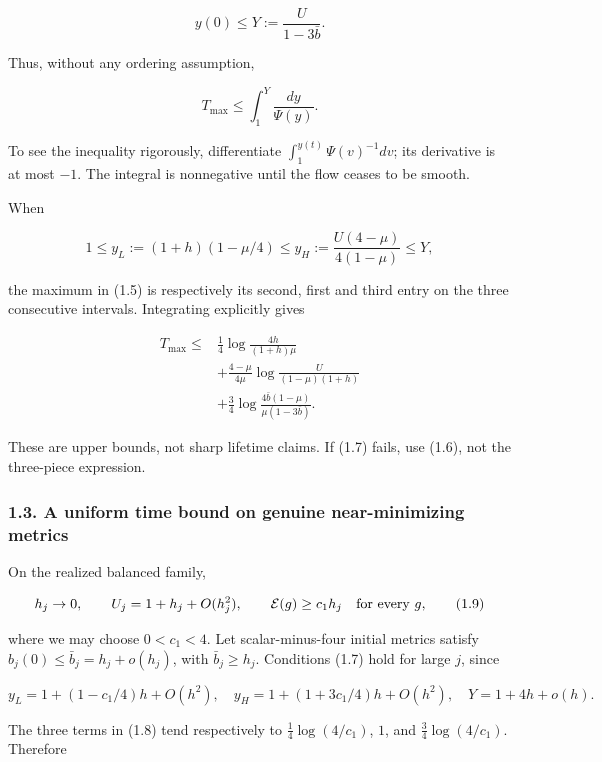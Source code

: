 \documentclass[
  10pt,
]{article}
\begin{document}
\[
 y(0)\le Y:=\frac U{1-3\bar b}.
\]

Thus, without any ordering assumption,

\[
                 T_{\max}\le\int_1^Y\frac{dy}{\Psi(y)}.       \tag{1.6}
\]

To see the inequality rigorously, differentiate
\(\int_1^{y(t)}\Psi(v)^{-1}dv\); its derivative is at most \(-1\). The
integral is nonnegative until the flow ceases to be smooth.

When

\[
 1\le y_L:=(1+h)(1-\mu/4)
 \le y_H:=\frac{U(4-\mu)}{4(1-\mu)}\le Y,            \tag{1.7}
\]

the maximum in (1.5) is respectively its second, first and third entry
on the three consecutive intervals. Integrating explicitly gives

\[
\boxed{\begin{aligned}
 T_{\max}\le{}&\frac14\log\frac{4h}{(1+h)\mu}\\
 &+\frac{4-\mu}{4\mu}
             \log\frac U{(1-\mu)(1+h)}\\
 &+\frac34\log\frac{4\bar b(1-\mu)}
                              {\mu(1-3\bar b)}.
\end{aligned}}                                                   \tag{1.8}
\]

These are upper bounds, not sharp lifetime claims. If (1.7) fails, use
(1.6), not the three-piece expression.

\hypertarget{a-uniform-time-bound-on-genuine-near-minimizing-metrics}{%
\subsubsection{1.3. A uniform time bound on genuine near-minimizing
metrics}\label{a-uniform-time-bound-on-genuine-near-minimizing-metrics}}

On the realized balanced family,

\[
 h_j\to0,\qquad U_j=1+h_j+O(h_j^2),\qquad
 \mathcal E(g)\ge c_1h_j\quad\hbox{for every }g,       \tag{1.9}
\]

where we may choose \(0<c_1<4\). Let scalar-minus-four initial metrics
satisfy \(b_j(0)\le\bar b_j=h_j+o(h_j)\), with \(\bar b_j\ge h_j\).
Conditions (1.7) hold for large \(j\), since

\[
 y_L=1+(1-c_1/4)h+O(h^2),\quad
 y_H=1+(1+3c_1/4)h+O(h^2),\quad
 Y=1+4h+o(h).
\]

The three terms in (1.8) tend respectively to \(\frac14\log(4/c_1)\),
\(1\), and \(\frac34\log(4/c_1)\). Therefore
\end{document}
